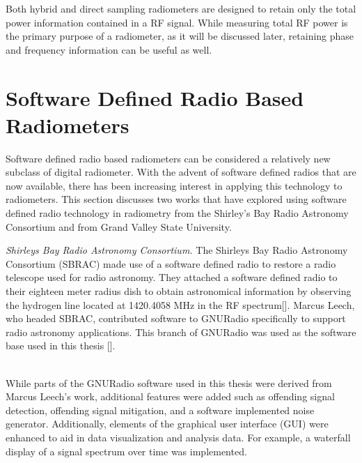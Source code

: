 Both hybrid and direct sampling radiometers are designed to retain only the total power information contained in a RF signal.  While measuring total RF power is the primary purpose of a radiometer, as it will be discussed later, retaining phase and frequency information can be useful as well.

\section{Software Defined Radio Based Radiometers}

Software defined radio based radiometers can be considered a relatively new subclass of digital radiometer.  With the advent of software defined radios that are now available, there has been increasing interest in applying this technology to radiometers.  This section discusses two works that have explored using software defined radio technology in radiometry from the Shirley's Bay Radio Astronomy Consortium and from Grand Valley State University.

\emph{Shirleys Bay Radio Astronomy Consortium.}  The Shirleys Bay Radio Astronomy Consortium (SBRAC) made use of a software defined radio to restore a radio telescope used for radio astronomy.  They attached a software defined radio to their eighteen meter radius dish to obtain astronomical information by observing the hydrogen line located at 1420.4058 MHz in the RF spectrum[\cite{Leech2007}].  Marcus Leech, who headed SBRAC, contributed software to GNURadio specifically to support radio astronomy applications.  This branch of GNURadio was used as the software base used in this thesis [\cite{Leech}].

\ \\

While parts of the GNURadio software used in this thesis were derived from Marcus Leech's work, additional features were added such as offending signal detection, offending signal mitigation, and a software implemented noise generator.  Additionally, elements of the graphical user interface (GUI) were enhanced to aid in data visualization and analysis data.  For example, a waterfall display of a signal spectrum over time was implemented.

